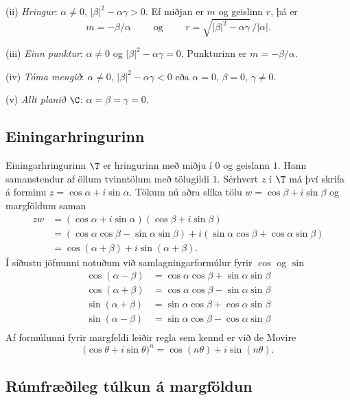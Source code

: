 \noindent
(ii) {\it Hringur}:  $\alpha\neq 0$,
$|\beta|^2-{\alpha}\gamma>0$.  Ef miðjan er  $m$ og 
geislinn  $r$, þá er 
$$m=-\beta/\alpha\qquad \text{ og } \qquad
r=\sqrt{|\beta|^2-\alpha\gamma}\, /|\alpha|.
$$

\noindent
(iii)  {\it Einn punktur}: $\alpha\neq 0$ og
$|\beta|^2-\alpha\gamma=0$.   Punkturinn er
$m=-\beta/\alpha$. 

\noindent
(iv) {\it Tóma mengið}:  $\alpha\neq 0$,
$|\beta|^2-\alpha\gamma<0$ eða $\alpha=0$, $\beta=0$,
$\gamma\neq 0$.  

\noindent
(v) {\it Allt planið $\C$}:  $\alpha=\beta=\gamma=0$.


\subsection*{Einingarhringurinn}

Einingarhringurinn $\T$ er hringurinn með miðju í $0$
og geislann $1$.  Hann samanstendur af öllum tvinntölum 
með tölugildi $1$.  Sérhvert $z$ í $\T$  má því skrifa
á forminu  $z=\cos \alpha+i\sin \alpha$. 
Tökum nú aðra slíka tölu 
$w=\cos \beta+i\sin \beta$ og 
margföldum saman
\begin{align*}
zw&=(\cos \alpha +i\sin \alpha)(\cos \beta+i\sin \beta) \\
&=(\cos\alpha\cos\beta-\sin\alpha\sin\beta)+i(\sin\alpha\cos\beta+\cos
\alpha\sin\beta)\\
&=\cos(\alpha+\beta)+i\sin(\alpha+\beta). 
\end{align*}
Í síðustu jöfnunni notuðum við samlagningarformúlur fyrir $\cos$ og
$\sin$
\begin{align*}
\cos(\alpha-\beta) &=\cos \alpha \cos \beta +\sin \alpha \sin \beta \\
\cos(\alpha+\beta) &=\cos \alpha \cos \beta -\sin \alpha \sin \beta \\
\sin(\alpha+\beta) &=\sin \alpha \cos \beta + \cos \alpha \sin \beta \\
\sin(\alpha-\beta) &=\sin \alpha \cos \beta - \cos \alpha \sin \beta \\
\end{align*}
Af  formúlunni fyrir margfeldi leiðir regla sem kennd er 
við de Movire
$$
\big(\cos\theta+i\sin\theta\big)^n
=\cos(n\theta)+i\sin(n\theta).
$$

\subsection*{Rúmfræðileg túlkun á margföldun}

